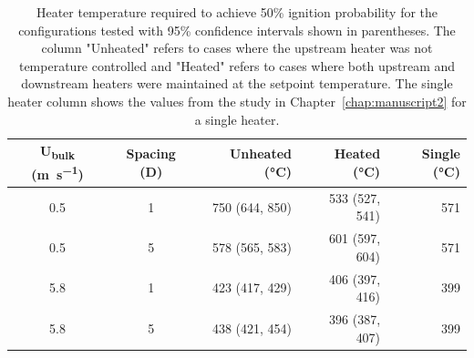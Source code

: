         \begin{table}[hpbt]
            \normalsize
            \caption{Heater temperature required to achieve 50\% ignition probability for the configurations tested with 95\% confidence intervals shown in parentheses. The column "Unheated" refers to cases where the upstream heater was not temperature controlled and "Heated" refers to cases where both upstream and downstream heaters were maintained at the setpoint temperature. The single heater column shows the values from the study in Chapter~\ref{chap:manuscript2} for a single heater.}
            \centering
            \begin{tabular}{ccrrr}
                \rowcolor{gray!50}
               U\textsubscript{bulk} (\si{\meter\per\second}) & Spacing (D) & Unheated (\si{\celsius})& Heated (\si{\celsius}) & Single (\si{\celsius})\\
                \hline
                0.5  & 1 & 750 (644, 850) & 533 (527, 541) & 571\\
                0.5  & 5 & 578 (565, 583) & 601 (597, 604) & 571\\
                5.8  & 1 & 423 (417, 429) & 406 (397, 416) & 399\\
                5.8  & 5 & 438 (421, 454) & 396 (387, 407) & 399
            \end{tabular}
            \label{tab:multiFiftyTemp}
        \end{table}
        
